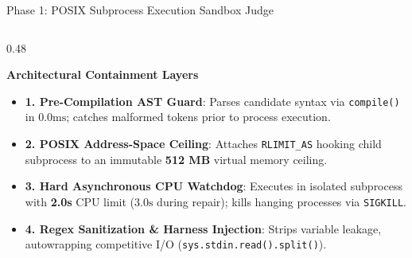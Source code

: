 \documentclass[aspectratio=169,10pt]{beamer}
\begin{document}
\begin{frame}{Phase 1: POSIX Subprocess Execution Sandbox Judge}
  \begin{columns}[T]
    \begin{column}{0.48\textwidth}
      \begin{block}{\textbf{Architectural Containment Layers}}
        \begin{itemize}\itemsep=2.5pt\footnotesize
          \item \textbf{1. Pre-Compilation AST Guard}:
          Parses candidate syntax via \texttt{compile()} in $0.0\text{ms}$; catches malformed tokens prior to process execution.
          \item \textbf{2. POSIX Address-Space Ceiling}:
          Attaches \texttt{RLIMIT\_AS} hooking child subprocess to an immutable \textbf{512 MB} virtual memory ceiling.
          \item \textbf{3. Hard Asynchronous CPU Watchdog}:
          Executes in isolated subprocess with \textbf{2.0s} CPU limit ($3.0\text{s}$ during repair); kills hanging processes via \texttt{SIGKILL}.
          \item \textbf{4. Regex Sanitization \& Harness Injection}:
          Strips variable leakage, autowrapping competitive I/O (\texttt{sys.stdin.read().split()}).
        \end{itemize}
      \end{block}
    \end{column}


\end{columns}
\end{frame}
\end{document}
